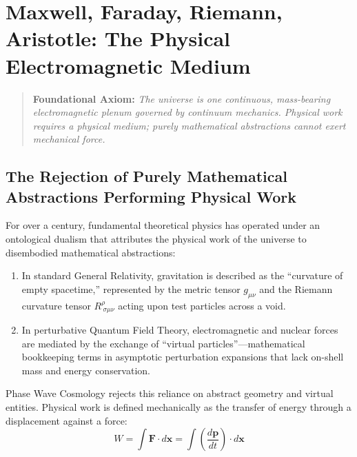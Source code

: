 \documentclass[11pt,a4paper]{article}
\begin{document}

\section{Maxwell, Faraday, Riemann, Aristotle: The Physical Electromagnetic Medium}
\label{sec:medium_foundations}

\begin{quote}
\centering
\textbf{Foundational Axiom:} \textit{The universe is one continuous, mass-bearing electromagnetic plenum governed by continuum mechanics. Physical work requires a physical medium; purely mathematical abstractions cannot exert mechanical force.}
\end{quote}

\subsection{The Rejection of Purely Mathematical Abstractions Performing Physical Work}
\label{subsec:rejection_abstractions}

For over a century, fundamental theoretical physics has operated under an ontological dualism that attributes the physical work of the universe to disembodied mathematical abstractions:
\begin{enumerate}
    \item In standard General Relativity, gravitation is described as the ``curvature of empty spacetime,'' represented by the metric tensor $g_{\mu\nu}$ and the Riemann curvature tensor $R^\rho_{\ \sigma\mu\nu}$ acting upon test particles across a void.
    \item In perturbative Quantum Field Theory, electromagnetic and nuclear forces are mediated by the exchange of ``virtual particles''---mathematical bookkeeping terms in asymptotic perturbation expansions that lack on-shell mass and energy conservation.
\end{enumerate}

Phase Wave Cosmology rejects this reliance on abstract geometry and virtual entities. Physical work is defined mechanically as the transfer of energy through a displacement against a force:
\begin{equation}
W = \int \mathbf{F} \cdot d\mathbf{x} = \int \left( \frac{d\mathbf{p}}{dt} \right) \cdot d\mathbf{x}
\end{equation}
\end{document}
